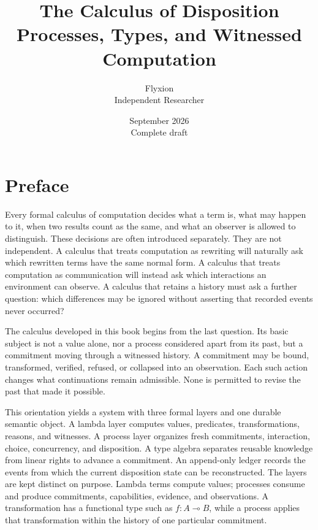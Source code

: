 \documentclass[11pt,openany]{book}
\title{\textbf{The Calculus of Disposition}\\[0.6em]
\large Processes, Types, and Witnessed Computation}
\author{Flyxion\\Independent Researcher}
\date{September 2026\\[1em]\small Complete draft}
\theoremstyle{remark}
\begin{document}
\frontmatter
\maketitle
\tableofcontents

\chapter{Preface}

Every formal calculus of computation decides what a term is, what may
happen to it, when two results count as the same, and what an observer is
allowed to distinguish. These decisions are often introduced separately.
They are not independent. A calculus that treats computation as rewriting
will naturally ask which rewritten terms have the same normal form. A
calculus that treats computation as communication will instead ask which
interactions an environment can observe. A calculus that retains a history
must ask a further question: which differences may be ignored without
asserting that recorded events never occurred?

The calculus developed in this book begins from the last question. Its
basic subject is not a value alone, nor a process considered apart from its
past, but a commitment moving through a witnessed history. A commitment
may be bound, transformed, verified, refused, or collapsed into an
observation. Each such action changes what continuations remain admissible.
None is permitted to revise the past that made it possible.

This orientation yields a system with three formal layers and one durable
semantic object. A lambda layer computes values, predicates,
transformations, reasons, and witnesses. A process layer organizes fresh
commitments, interaction, choice, concurrency, and disposition. A type
algebra separates reusable knowledge from linear rights to advance a
commitment. An append-only ledger records the events from which the current
disposition state can be reconstructed. The layers are kept distinct on
purpose. Lambda terms compute values; processes consume and produce
commitments, capabilities, evidence, and observations. A transformation has
a functional type such as $f:A\multimap B$, while a process applies that
transformation within the history of one particular commitment.
\end{document}
